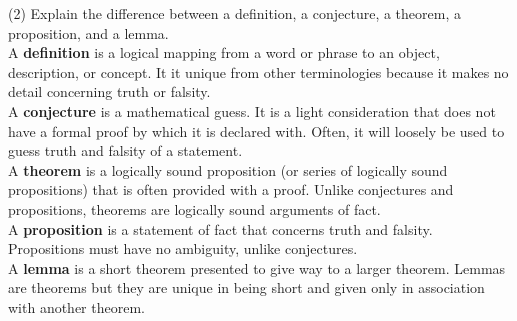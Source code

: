 \documentclass{article}
\begin{document}
(2) Explain the difference between a definition, a conjecture, a theorem, a proposition, and a lemma.\\

A \textbf{definition} is a logical mapping from a word or phrase to an object, description, or concept. It it unique from other terminologies because it makes no detail concerning truth or falsity.\\

A \textbf{conjecture} is a mathematical guess. It is a light consideration that does not have a formal proof by which it is declared with. Often, it will loosely be used to guess truth and falsity of a statement. \\

A \textbf{theorem} is a logically sound proposition (or series of logically sound propositions) that is often provided with a proof. Unlike conjectures and propositions, theorems are logically sound arguments of fact.\\

A \textbf{proposition} is a statement of fact that concerns truth and falsity. Propositions must have no ambiguity, unlike conjectures.\\

A \textbf{lemma} is a short theorem presented to give way to a larger theorem. Lemmas are theorems but they are unique in being short and given only in association with another theorem.
\end{document}
